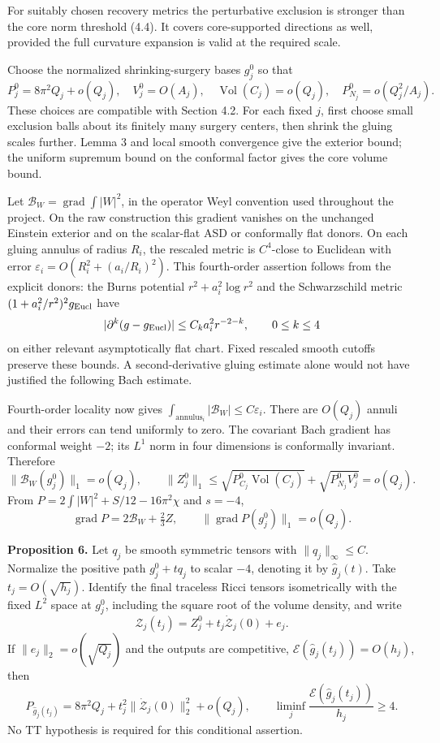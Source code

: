 \documentclass[
  11pt,
]{article}
\begin{document}
For suitably chosen recovery metrics the perturbative exclusion is
stronger than the core norm threshold (4.4). It covers core-supported
directions as well, provided the full curvature expansion is valid at
the required scale.

Choose the normalized shrinking-surgery bases \(g_j^0\) so that \[
 P_j^0=8\pi^2Q_j+o(Q_j),\quad V_j^0=O(A_j),\quad
 \operatorname{Vol}(C_j)=o(Q_j),\quad
 P_{N_j}^0=o(Q_j^2/A_j). \tag{4.11}
\] These choices are compatible with Section 4.2. For each fixed \(j\),
first choose small exclusion balls about its finitely many surgery
centers, then shrink the gluing scales further. Lemma 3 and local smooth
convergence give the exterior bound; the uniform supremum bound on the
conformal factor gives the core volume bound.

Let \(\mathcal B_W=\operatorname{grad}\int|W|^2\), in the operator Weyl
convention used throughout the project. On the raw construction this
gradient vanishes on the unchanged Einstein exterior and on the
scalar-flat ASD or conformally flat donors. On each gluing annulus of
radius \(R_i\), the rescaled metric is \(C^4\)-close to Euclidean with
error \(\varepsilon_i=O(R_i^2+(a_i/R_i)^2)\). This fourth-order
assertion follows from the explicit donors: the Burns potential
\(r^2+a_i^2\log r^2\) and the Schwarzschild metric
\((1+a_i^2/r^2)^2g_{\rm Eucl}\) have \[
 |\partial^k(g-g_{\rm Eucl})|\le C_k a_i^2r^{-2-k},
 \qquad 0\le k\le4
\] on either relevant asymptotically flat chart. Fixed rescaled smooth
cutoffs preserve these bounds. A second-derivative gluing estimate alone
would not have justified the following Bach estimate.

Fourth-order locality now gives
\(\int_{\mathrm{annulus}_i}|\mathcal B_W|\le C\varepsilon_i\). There are
\(O(Q_j)\) annuli and their errors can tend uniformly to zero. The
covariant Bach gradient has conformal weight \(-2\); its \(L^1\) norm in
four dimensions is conformally invariant. Therefore \[
 \|\mathcal B_W(g_j^0)\|_1=o(Q_j),\qquad
 \|Z_j^0\|_1
 \le\sqrt{P_{C_j}^0\operatorname{Vol}(C_j)}
       +\sqrt{P_{N_j}^0V_j^0}=o(Q_j). \tag{4.12}
\] From \(P=2\int|W|^2+S/12-16\pi^2\chi\) and \(s=-4\), \[
 \operatorname{grad}P=2\mathcal B_W+\tfrac23 Z,\qquad
 \|\operatorname{grad}P(g_j^0)\|_1=o(Q_j). \tag{4.13}
\]

\textbf{Proposition 6.} Let \(q_j\) be smooth symmetric tensors with
\(\|q_j\|_\infty\le C\). Normalize the positive path \(g_j^0+tq_j\) to
scalar \(-4\), denoting it by \(\widehat g_j(t)\). Take
\(t_j=O(\sqrt{h_j})\). Identify the final traceless Ricci tensors
isometrically with the fixed \(L^2\) space at \(g_j^0\), including the
square root of the volume density, and write \[
 \mathcal Z_j(t_j)=Z_j^0+t_j\dot{\mathcal Z}_j(0)+e_j. \tag{4.14}
\] If \(\|e_j\|_2=o(\sqrt{Q_j})\) and the outputs are competitive,
\(\mathcal E(\widehat g_j(t_j))=O(h_j)\), then \[
 P_{\widehat g_j(t_j)}
     =8\pi^2Q_j+t_j^2\|\dot{\mathcal Z}_j(0)\|_2^2+o(Q_j),
 \qquad \liminf_j\frac{\mathcal E(\widehat g_j(t_j))}{h_j}\ge4.
 \tag{4.15}
\] No TT hypothesis is required for this conditional assertion.
\end{document}
